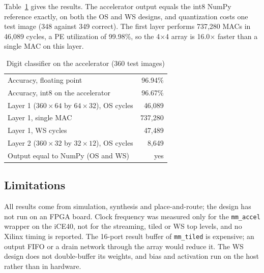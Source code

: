 \documentclass[conference]{IEEEtran}
\newcommand{\code}[1]{\texttt{#1}}
\begin{document}
Table~\ref{tab:nn} gives the results. The accelerator output equals the int8 NumPy reference exactly, on both the OS and WS designs, and quantization costs one test image (348 against 349 correct). The first layer performs 737,280 MACs in 46,089 cycles, a PE utilization of 99.98\%, so the 4$\times$4 array is 16.0$\times$ faster than a single MAC on this layer.

\begin{table}[t]
\centering
\caption{Digit classifier on the accelerator (360 test images)}
\label{tab:nn}
\begin{tabular}{lr}
\toprule
Accuracy, floating point & 96.94\% \\
Accuracy, int8 on the accelerator & 96.67\% \\
Layer 1 ($360{\times}64$ by $64{\times}32$), OS cycles & 46,089 \\
Layer 1, single MAC & 737,280 \\
Layer 1, WS cycles & 47,489 \\
Layer 2 ($360{\times}32$ by $32{\times}12$), OS cycles & 8,649 \\
Output equal to NumPy (OS and WS) & yes \\
\bottomrule
\end{tabular}
\end{table}

\subsection{Limitations}
All results come from simulation, synthesis and place-and-route; the design has not run on an FPGA board. Clock frequency was measured only for the \code{mm\_accel} wrapper on the iCE40, not for the streaming, tiled or WS top levels, and no Xilinx timing is reported. The 16-port result buffer of \code{mm\_tiled} is expensive; an output FIFO or a drain network through the array would reduce it. The WS design does not double-buffer its weights, and bias and activation run on the host rather than in hardware.
\end{document}

